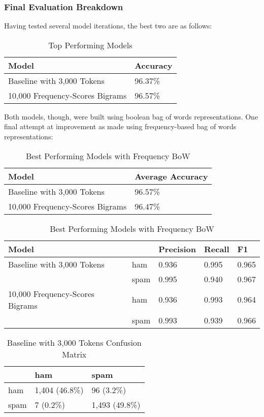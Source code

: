 \documentclass[a4paper]{article}
\begin{document}
	\subsubsection{Final Evaluation Breakdown}
	
	Having tested several model iterations, the best two are as follows:
	
	\begin{table}[H]
		\centering
		\caption{Top Performing Models}
		\begin{tabular}{ll}
			Model & Accuracy \\
			\hline
			Baseline with 3,000 Tokens & 96.37\% \\
			10,000 Frequency-Scores Bigrams & 96.57\%
		\end{tabular}
	\end{table}

	Both models, though, were built using boolean bag of words representations. One final attempt at improvement as made using frequency-based bag of words representations:

	\begin{table}[H]
		\centering
		\caption{Best Performing Models with Frequency BoW}
		\begin{tabular}{ll}
			Model & Average Accuracy \\
			\hline
			Baseline with 3,000 Tokens & 96.57\% \\
			10,000 Frequency-Scores Bigrams & 96.47\%
		\end{tabular}
		\begin{tabular}{l|llll}
			\hline
			\hline
			Model & & Precision & Recall & F1 \\
			\hline
			Baseline with 3,000 Tokens & ham  & 0.936 & 0.995 & 0.965 \\
									   & spam & 0.995 & 0.940 & 0.967 \\
			\hline
			10,000 Frequency-Scores Bigrams & ham  & 0.936 & 0.993 & 0.964 \\
			                                & spam & 0.993 & 0.939 & 0.966 \\
		\end{tabular}
	\end{table}

	\begin{table}[H]
		\centering
		\caption{Baseline with 3,000 Tokens Confusion Matrix}
		\begin{tabular}{l|ll}
			& ham & spam \\
			\hline
			ham & 1,404 (46.8\%) & 96 (3.2\%) \\
			spam & 7 (0.2\%) & 1,493 (49.8\%)
		\end{tabular}
	\end{table}
\end{document}
